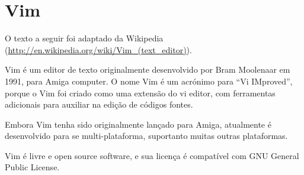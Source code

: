 % 
% 
% 
% 
% 
\chapter{Vim}
O texto a seguir foi adaptado da Wikipedia (\url{http://en.wikipedia.org/wiki/Vim_(text_editor)}).

Vim é um editor de texto originalmente desenvolvido por Bram Moolenaar em 1991, para Amiga computer. O nome Vim é um acrónimo para ``Vi IMproved'', porque o Vim foi criado como uma extensão do vi editor, com ferramentas adicionais para auxiliar na edição de códigos fontes.

Embora Vim tenha sido originalmente lançado para Amiga, atualmente é desenvolvido para se multi-plataforma, suportanto muitas outras plataformas.

Vim é livre e open source software, e sua licença é compatível com GNU General Public License.
